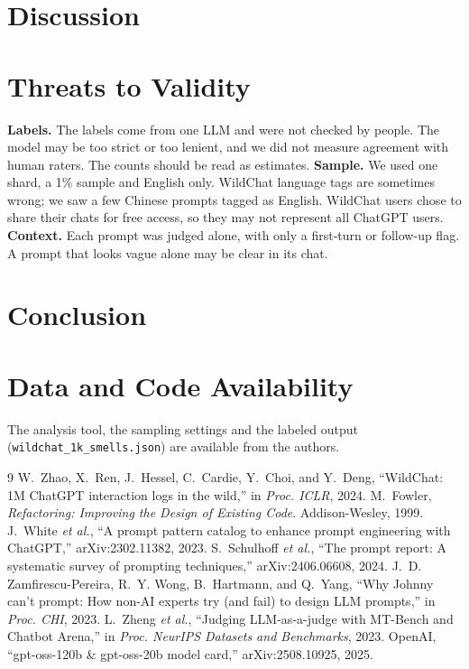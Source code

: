 \documentclass[conference]{IEEEtran}
\begin{document}
\section{Discussion}

\section{Threats to Validity}
\textbf{Labels.} The labels come from one LLM and were not checked by people.
The model may be too strict or too lenient, and we did not measure agreement with
human raters. The counts should be read as estimates.
\textbf{Sample.} We used one shard, a 1\% sample and English only. WildChat
language tags are sometimes wrong; we saw a few Chinese prompts tagged as English.
WildChat users chose to share their chats for free access, so they may not
represent all ChatGPT users.
\textbf{Context.} Each prompt was judged alone, with only a first-turn or follow-up
flag. A prompt that looks vague alone may be clear in its chat.

\section{Conclusion}

\section*{Data and Code Availability}
The analysis tool, the sampling settings and the labeled output
(\texttt{wildchat\_1k\_smells.json}) are available from the authors.

\begin{thebibliography}{9}
 W.~Zhao, X.~Ren, J.~Hessel, C.~Cardie, Y.~Choi, and Y.~Deng,
``WildChat: 1M ChatGPT interaction logs in the wild,'' in \emph{Proc. ICLR}, 2024.
 M.~Fowler, \emph{Refactoring: Improving the Design of Existing
Code}. Addison-Wesley, 1999.
 J.~White \emph{et al.}, ``A prompt pattern catalog to enhance
prompt engineering with ChatGPT,'' arXiv:2302.11382, 2023.
 S.~Schulhoff \emph{et al.}, ``The prompt report: A
systematic survey of prompting techniques,'' arXiv:2406.06608, 2024.
 J.~D. Zamfirescu-Pereira, R.~Y. Wong, B.~Hartmann, and Q.~Yang,
``Why Johnny can't prompt: How non-AI experts try (and fail) to design LLM
prompts,'' in \emph{Proc. CHI}, 2023.
 L.~Zheng \emph{et al.}, ``Judging LLM-as-a-judge with MT-Bench and
Chatbot Arena,'' in \emph{Proc. NeurIPS Datasets and Benchmarks}, 2023.
 OpenAI, ``gpt-oss-120b \& gpt-oss-20b model card,''
arXiv:2508.10925, 2025.
\end{thebibliography}
\end{document}
